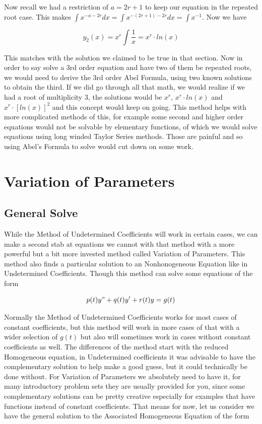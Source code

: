 \documentclass[12pt]{article}
\begin{document}
Now recall we had a restriction of $a=2r+1$ to keep our equation in the repeated root case. This makes $\int x^{-a-2r} dx=\int x^{-(2r+1)-2r} dx=\int x^{-1}$. Now we have

\begin{equation*}
    y_2(x) = x^r \int \frac{1}{x} = x^r \cdot ln(x)
\end{equation*}

This matches with the solution we claimed to be true in that section. Now in order to say solve a 3rd order equation and have two of them be repeated roots, we would need to derive the 3rd order Abel Formula, using two known solutions to obtain the third. If we did go through all that math, we would realize if we had a root of multiplicity 3, the solutions would be $x^r$, $x^r\cdot ln(x)$ and $x^r\cdot [ln(x)]^2$ and this concept would keep on going. This method helps with more complicated methods of this, for example some second and higher order equations would not be solvable by elementary functions, of which we would solve equations using long winded Taylor Series methods. Those are painful and so using Abel's Formula to solve would cut down on some work.

\pagebreak

\section{Variation of Parameters}

\subsection{General Solve}

While the Method of Undetermined Coefficients will work in certain cases, we can make a second stab at equations we cannot with that method with a more powerful but a bit more invested method called Variation of Parameters. This method also finds a particular solution to an Nonhonogeneous Equation like in Undetermined Coefficients. Though this method can solve some equations of the form

\begin{equation*}
    p(t)y"+q(t)y'+r(t)y=g(t)
\end{equation*}

Normally the Method of Undetermined Coefficients works for most cases of constant coefficients, but this method will work in more cases of that with a wider selection of $g(t)$ but also will sometimes work in cases without constant coefficients as well. The differences of the method start with the reduced Homogeneous equation, in Undetermined coefficients it was advisable to have the complementary solution to help make a good guess, but it could technically be done without. For Variation of Parameters we absolutely need to have it, for many introductory problem sets they are usually provided for you, since some complementary solutions can be pretty creative especially for examples that have functions instead of constant coefficients. That means for now, let us consider we have the general solution to the Associated Homogeneous Equation of the form
\end{document}
